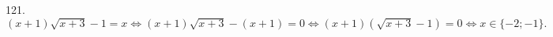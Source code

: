 121. $(x+1)\sqrt{x+3}-1=x\Leftrightarrow(x+1)\sqrt{x+3}-(x+1)=0\Leftrightarrow (x+1)(\sqrt{x+3}-1)=0\Leftrightarrow x\in\{-2;-1\}.$\\

